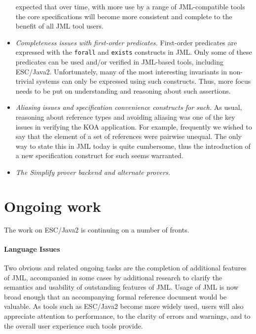 \documentclass{llncs}
\begin{document}
\begin{itemize}
  expected that over time, with more use by a range of JML-compatible
  tools the core specifications will become more consistent and
  complete to the benefit of all JML tool users.
\item \emph{Completeness issues with first-order predicates.}
  First-order predicates are expressed with the \texttt{forall} and
  \texttt{exists} constructs in JML.  Only some of these predicates
  can be used and/or verified in JML-based tools, including ESC/Java2.
  Unfortunately, many of the most interesting invariants in
  non-trivial systems can only be expressed using such constructs.
  Thus, more focus needs to be put on understanding and reasoning
  about such assertions.
\item \emph{Aliasing issues and specification convenience constructs
    for such.}  As usual, reasoning about reference types and avoiding
  aliasing was one of the key issues in verifying the KOA application.
  For example, frequently we wished to say that the element of a set of references
 were pairwise unequal.  The only way to
  state this in JML today is quite cumbersome, thus the introduction
  of a new specification construct for such seems warranted.
\item \emph{The Simplify prover backend and alternate provers.}
\end{itemize}


\section{Ongoing work}
The work on ESC/Java2 is continuing on a number of fronts.

\paragraph*{Language Issues} Two obvious and related ongoing tasks are
the completion of additional features of JML, accompanied in some
cases by additional research to clarify the semantics and usability of
outstanding features of JML.  Usage of JML is now broad enough that an
accompanying formal reference document would be valuable.  As
tools such as ESC/Java2 become more widely used, users will also
appreciate attention to performance, to the clarity of errors and
warnings, and to the overall user experience such tools provide.
\end{document}
